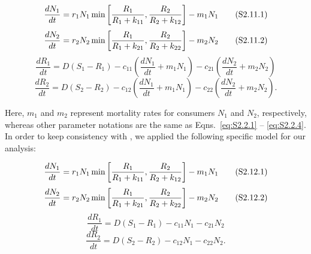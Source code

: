 \begin{equation}
\frac{{d{N_1}}}{{dt}} = {r_1}{N_1}\min \left[ {\frac{{{R_1}}}{{{R_1} + {k_{11}}}},{\rm{ }}\frac{{{R_2}}}{{{R_2} + {k_{12}}}}} \right] - {m_1}{N_1} 
\tag{S2.11.1}\label{eq:S2.11.1}
\end{equation}
\begin{equation}
\frac{{d{N_2}}}{{dt}} = {r_2}{N_2}\min \left[ {\frac{{{R_1}}}{{{R_1} + {k_{21}}}},{\rm{ }}\frac{{{R_2}}}{{{R_2} + {k_{22}}}}} \right] - {m_2}{N_2}
\tag{S2.11.2}\label{eq:S2.11.2}
\end{equation}
\begin{equation}
\frac{{d{R_1}}}{{dt}} = D\left( {{S_1} - {R_1}} \right) - {c_{11}}\left( {\frac{{d{N_1}}}{{dt}} + {m_1}{N_1}} \right) - {c_{21}}\left( {\frac{{d{N_2}}}{{dt}} + {m_2}{N_2}} \right)
\tag{S2.11.3}\label{eq:S2.11.3}
\end{equation}
\begin{equation}
\frac{{d{R_2}}}{{dt}} = D\left( {{S_2} - {R_2}} \right) - {c_{12}}\left( {\frac{{d{N_1}}}{{dt}} + {m_1}{N_1}} \right) - {c_{22}}\left( {\frac{{d{N_2}}}{{dt}} + {m_2}{N_2}} \right).
\tag{S2.11.4}\label{eq:S2.11.4}
\end{equation}

\noindent Here, $m_1$ and $m_2$ represent mortality rates for consumers $N_1$ and $N_2$, respectively, whereas other parameter notations are the same as Eqns.~\ref{eq:S2.2.1} -- \ref{eq:S2.2.4}. In order to keep consistency with \cite[Ch.~7]{tilman1982}, we applied the following specific model for our analysis:  

\begin{equation}
\frac{{d{N_1}}}{{dt}} = {r_1}{N_1}\min \left[ {\frac{{{R_1}}}{{{R_1} + {k_{11}}}},{\rm{ }}\frac{{{R_2}}}{{{R_2} + {k_{12}}}}} \right] - {m_1}{N_1}
\tag{S2.12.1}\label{eq:S2.12.1}
\end{equation}
\begin{equation}
\frac{{d{N_2}}}{{dt}} = {r_2}{N_2}\min \left[ {\frac{{{R_1}}}{{{R_1} + {k_{21}}}},{\rm{ }}\frac{{{R_2}}}{{{R_2} + {k_{22}}}}} \right] - {m_2}{N_2}
\tag{S2.12.2}\label{eq:S2.12.2}
\end{equation}
\begin{equation}
\frac{{d{R_1}}}{{dt}} = D\left( {{S_1} - {R_1}} \right) - {c_{11}}{N_{1}} - {c_{21}}{N_{2}}
\tag{S2.12.3}\label{eq:S2.12.3}
\end{equation}
\begin{equation}
\frac{{d{R_2}}}{{dt}} = D\left( {{S_2} - {R_2}} \right) - {c_{12}}{N_{1}} - {c_{22}}{N_{2}}.
\tag{S2.12.4}\label{eq:S2.12.4}
\end{equation}

